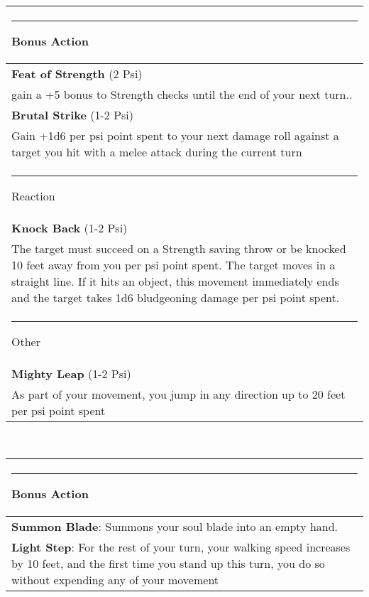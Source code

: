 \documentclass[twocolumn]{article}
\begin{document}
\\
\noindent\begin{tabular}{|m{3.1in}|}
\hline
\rule{1.1in}{0pt}Bonus Action\\
\hline
\textbf{Feat of Strength} (2 Psi)\\
gain	a	+5	bonus	to	Strength	checks	until	the	
end	of your	next	turn..\\
\textbf{Brutal Strike} (1-2 Psi)\\
Gain	+1d6 per psi point spent	to	your	next	damage	roll	against	a	
target	you	hit	with	a	melee	attack	during	the	
current	turn\\
\hline
\rule{1.2in}{0pt}Reaction\\
\hline
\textbf{Knock Back} (1-2 Psi) \\
The	target	must	succeed	on	a	
Strength	saving	throw	or	be	knocked	10	feet	
away	from	you	per	psi	point	spent.	The	target	
moves	in	a	straight	line.	If	it	hits	an	object,	this	
movement	immediately	ends	and	the	target	
takes	1d6	bludgeoning	damage	per	psi	point	
spent.\\
\hline
\rule{1.3in}{0pt}Other\\
\hline
\textbf{Mighty Leap} (1-2 Psi) \\
As	part	of	your	
movement,	you	jump	in	any	direction	up	to	20	
feet	per	psi	point	spent \\
\hline
\end{tabular}
\vspace{8pt}

\\
\noindent\begin{tabular}{|m{3.1in}|}
\hline
\rule{1.1in}{0pt}Bonus Action\\
\hline
\textbf{Summon Blade}: Summons your soul blade into an empty hand. \\
\hline
\textbf{Light Step}: For	the	rest	of	
your	turn,	your	walking	speed	increases	by	10	
feet,	and	the	first	time	you	stand	up this	turn,
you	do	so	without	expending	any	of	your	
movement\\
\hline
\end{tabular}
\vspace{8pt}
\end{document}
